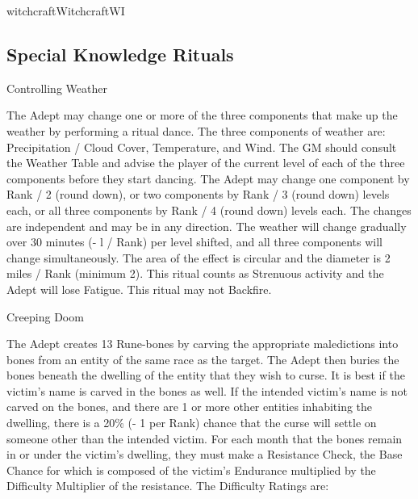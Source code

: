 \begin{college}[1.1]{witchcraft}{Witchcraft}{WI}
\subsection{Special Knowledge Rituals}

\begin{ritual}[R-1]{Controlling Weather}

\begin{effects}
The Adept may change one or more of the three components that make up
the weather by performing a ritual dance.  The three components of
weather are: Precipitation / Cloud Cover, Temperature, and Wind.  The
GM should consult the Weather Table and advise the player of the
current level of each of the three components before they start
dancing.  The Adept may change one component by Rank / 2 (round down),
or two components by Rank / 3 (round down) levels each, or all three
components by Rank / 4 (round down) levels each.  The changes are
independent and may be in any direction.  The weather will change
gradually over 30 minutes (- l / Rank) per level shifted, and all
three components will change simultaneously.  The area of the effect
is circular and the diameter is 2 miles / Rank (minimum 2).  This
ritual counts as Strenuous activity and the Adept will lose Fatigue.
This ritual may not Backfire.
\end{effects}
\end{ritual}

\begin{ritual}[R-2]{Creeping Doom}

\begin{effects}
The Adept creates 13 Rune-bones by carving the appropriate
maledictions into bones from an entity of the same race as the target.
The Adept then buries the bones beneath the dwelling of the entity
that they wish to curse. It is best if the victim's name is carved in
the bones as well.  If the intended victim's name is not carved on the
bones, and there are 1 or more other entities inhabiting the dwelling,
there is a 20\% (- 1 per Rank) chance that the curse will settle on
someone other than the intended victim.  For each month that the bones
remain in or under the victim's dwelling, they must make a Resistance
Check, the Base Chance for which is composed of the victim's Endurance
multiplied by the Difficulty Multiplier of the resistance.  The
Difficulty Ratings are:


\end{effects}
\end{ritual}
\end{college}

